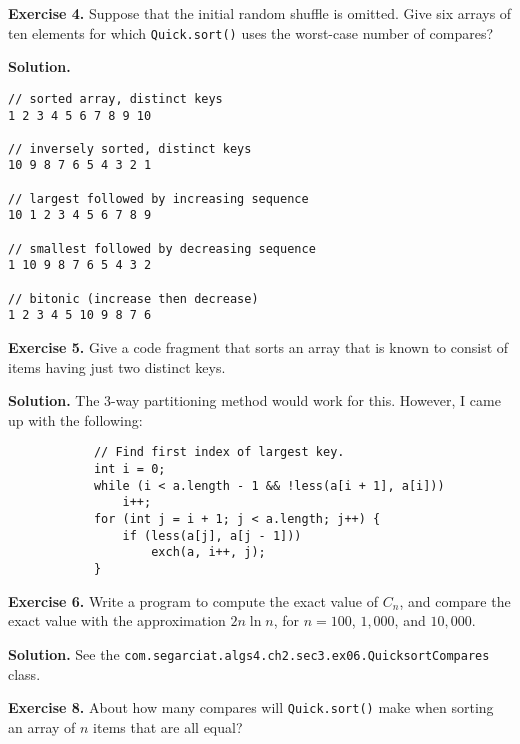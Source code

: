 \documentclass[12pt, a4paper]{article}
\newenvironment{ex}[2][Exercise]
{\par\medskip\noindent \textbf{#1 #2.}}
{\medskip}
\newenvironment{sol}[1][Solution]
{\par\medskip\noindent \textbf{#1.} }
{\medskip}
\begin{document}
	\begin{ex}{4}
		Suppose that the initial random shuffle is omitted. Give six arrays of ten elements
		for which \texttt{Quick.sort()} uses the worst-case number of compares?
	\end{ex}
	\begin{sol}
		\begin{lstlisting}[language={}]
// sorted array, distinct keys
1 2 3 4 5 6 7 8 9 10

// inversely sorted, distinct keys
10 9 8 7 6 5 4 3 2 1

// largest followed by increasing sequence
10 1 2 3 4 5 6 7 8 9

// smallest followed by decreasing sequence
1 10 9 8 7 6 5 4 3 2

// bitonic (increase then decrease)
1 2 3 4 5 10 9 8 7 6

		\end{lstlisting}
	\end{sol}
	\begin{ex}{5}
		Give a code fragment that sorts an array that is known to consist of items having
		just two distinct keys.
	\end{ex}
	\begin{sol}
		The 3-way partitioning method would work for this. However, I came up with
		the following:
		\begin{lstlisting}
			// Find first index of largest key.
			int i = 0;
			while (i < a.length - 1 && !less(a[i + 1], a[i]))
				i++;
			for (int j = i + 1; j < a.length; j++) {
				if (less(a[j], a[j - 1]))
					exch(a, i++, j);
			}
		\end{lstlisting}
	\end{sol}
	\begin{ex}{6}
		Write a program to compute the exact value of $C_n$, and compare the exact value
		with the approximation $2n\ln n$, for $n=100$, $1,000$, and $10,000$.
	\end{ex}
	\begin{sol}
		See the \texttt{com.segarciat.algs4.ch2.sec3.ex06.QuicksortCompares} class.
	\end{sol}
	\begin{ex}{8}
		About how many compares will \texttt{Quick.sort()} make when sorting an array of $n$
		items that are all equal?
	\end{ex}
\end{document}
